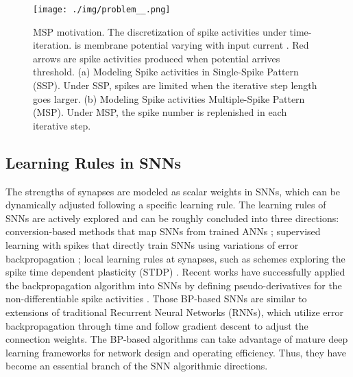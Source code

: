 \documentclass{article}
\begin{document}
\begin{figure}[hbtp]
    \centering
    \texttt{[image: ./img/problem\_\_.png]}
    \caption{MSP motivation. The discretization of spike activities under time-iteration.  is membrane potential varying with input current . Red arrows are spike activities produced when potential arrives threshold. (a) Modeling Spike activities in Single-Spike Pattern (SSP). Under SSP, spikes are limited when the iterative step length goes larger. (b) Modeling Spike activities Multiple-Spike Pattern (MSP). Under MSP, the spike number is replenished in each iterative step.
}
    \label{fig:problem}
\end{figure}

\subsection{Learning Rules in SNNs}
The strengths of synapses are modeled as scalar weights in SNNs, which can be dynamically adjusted following a specific learning rule. The learning rules of SNNs are actively explored and can be roughly concluded into three directions: conversion-based methods that map SNNs from trained ANNs \cite{han_rmp-snn_2020}; supervised learning with spikes that directly train SNNs using variations of error backpropagation \cite{lee_training_2016,wu_spatio-temporal_2018}; local learning rules at synapses, such as schemes exploring the spike time dependent plasticity (STDP) \cite{song_competitive_2000}. Recent works have successfully applied the backpropagation algorithm into SNNs by defining pseudo-derivatives for the non-differentiable spike activities \cite{lee_training_2016,wu_spatio-temporal_2018,tavanaei_deep_2019,cheng_lisnn_2020}. 
Those BP-based SNNs are similar to extensions of traditional Recurrent Neural Networks (RNNs), which utilize error backpropagation through time and follow gradient descent to adjust the connection weights.
The BP-based algorithms can take advantage of mature deep learning frameworks for network design and operating efficiency.
Thus, they have become an essential branch of the SNN algorithmic directions.
\end{document}

